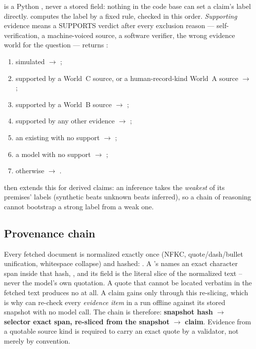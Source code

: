  is a Python , never a stored field: nothing in the code
base can set a claim's label directly. \evobs{} 
computes the label by a fixed rule, checked in this order. \emph{Supporting}
evidence means a SUPPORTS verdict after every exclusion reason --- self-verification, a
machine-voiced source, a software verifier, the wrong evidence world for the question --- returns
:
\begin{enumerate}[noitemsep]
  \item simulated $\rightarrow$ ;
  \item supported by a World~C source, or a human-record-kind World~A source $\rightarrow$
    ;
  \item supported by a World~B source $\rightarrow$ ;
  \item supported by any other evidence $\rightarrow$ ;
  \item an existing  with no support $\rightarrow$ ;
  \item a model  with no support $\rightarrow$ ;
  \item otherwise $\rightarrow$ .
\end{enumerate}
 then
extends this for derived claims: an inference takes the \emph{weakest} of its premises' labels
(synthetic beats unknown beats inferred), so a chain of reasoning cannot bootstrap a strong label
from a weak one.

\subsection{Provenance chain}

Every fetched document is normalized exactly once (NFKC, quote/dash/bullet unification, whitespace
collapse) and hashed: . \evobs{} A 's  names an
exact character span inside that hash, , and its
 field is the literal slice of the normalized text -- never the model's own quotation.
A quote that cannot be located verbatim in the fetched text produces no  at all. A
claim gains  only through this re-slicing, which is why  can
re-check every \emph{evidence item} in a run offline against its stored snapshot with no model
call. The chain is therefore: \textbf{snapshot hash} $\rightarrow$ \textbf{selector exact span,
re-sliced from the snapshot} $\rightarrow$ \textbf{claim}. Evidence from a quotable source kind is
required to carry an exact quote by a validator, not merely by convention.

